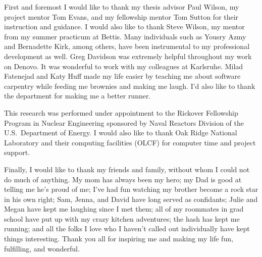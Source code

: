 \begin{acknowledgments}
First and foremost I would like to thank my thesis advisor Paul Wilson, my project mentor Tom Evans, and my fellowship mentor Tom Sutton for their instruction and guidance. I would also like to thank Steve Wilson, my mentor from my summer practicum at Bettis. Many individuals such as Yousry Azmy and Bernadette Kirk, among others, have been instrumental to my professional development as well. Greg Davidson was extremely helpful throughout my work on Denovo. It was wonderful to work with my colleagues at Karlsruhe. Milad Fatenejad and Katy Huff made my life easier by teaching me about software carpentry while feeding me brownies and making me laugh. I'd also like to thank the department for making me a better runner. 

This research was performed under appointment to the Rickover Fellowship Program in Nuclear Engineering sponsored by Naval Reactors Division of the U.S.\ Department of Energy. I would also like to thank Oak Ridge National Laboratory and their computing facilities (OLCF) for computer time and project support. 

Finally, I would like to thank my friends and family, without whom I could not do much of anything. My mom has always been my hero; my Dad is good at telling me he's proud of me; I've had fun watching my brother become a rock star in his own right;  Sam, Jenna, and David have long served as confidants; Julie and Megan have kept me laughing since I met them; all of my roommates in grad school have put up with my crazy kitchen adventures; the hash has kept me running; and all the folks I love who I haven't called out individually have kept things interesting. Thank you all for inspiring me and making my life fun, fulfilling, and wonderful.

\separatorpage{}

\end{acknowledgments}

\tableofcontents
\separatorpage{}
\listoftables
\listoffigures


